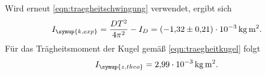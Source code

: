 Wird erneut \eqref{eqn:traegheitschwingung} verwendet, ergibt sich
\begin{equation}
  I_{\symup{k,exp}} = \frac{DT^2}{4\pi^2}-I_D = \SI{-1.32(021)e-3}{\kilogram\meter\squared}.
\end{equation}
Für das Trägheitsmoment der Kugel gemäß \eqref{eqn:traegheitkugel} folgt
\begin{equation}
  I_{\symup{z,theo}} = \SI{2.99e-3}{\kilogram\meter\squared}.
\end{equation}

\label{sec:Auswertung}
